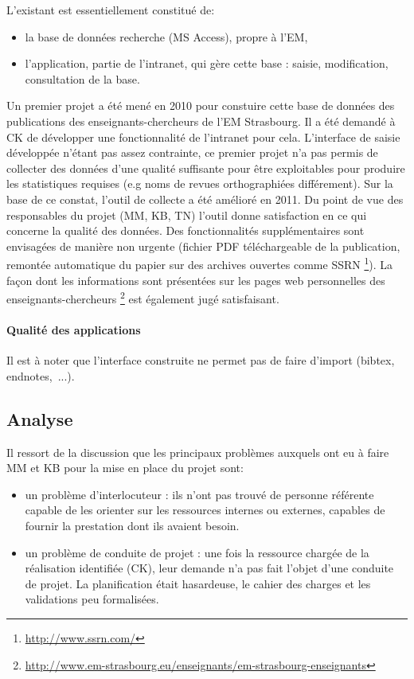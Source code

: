 \documentclass{book}
\begin{document}
L'existant est essentiellement constitué de:
\begin{itemize}
\item la base de données recherche (MS Access), propre à l'EM,
\item l'application, partie de l'intranet, qui gère cette base : saisie, 
modification, consultation de la base.
\end{itemize}
Un premier projet a été mené en 2010 pour constuire cette base de données des
publications des enseignants-chercheurs de l'EM Strasbourg. Il a été demandé à 
CK de développer une fonctionnalité de l'intranet pour cela. L'interface de 
saisie développée n'étant pas assez contrainte, ce premier projet n'a pas 
permis de collecter des données d'une qualité suffisante pour être exploitables
pour produire les statistiques requises (e.g noms de revues orthographiées 
différement). Sur la base de ce constat, l'outil de collecte a été amélioré en 
2011. Du point de vue des responsables du projet (MM, KB, TN) l'outil donne 
satisfaction en ce qui concerne la qualité des données. Des fonctionnalités 
supplémentaires sont envisagées de manière non urgente (fichier PDF téléchargeable 
de la publication, remontée automatique du papier sur des archives ouvertes comme SSRN%
\footnote{\url{ http://www.ssrn.com/}}).
La façon dont les informations sont présentées sur les pages web personnelles
des enseignants-chercheurs%
\footnote{\url{http://www.em-strasbourg.eu/enseignants/em-strasbourg-enseignants}}
est également jugé satisfaisant.

\paragraph{Qualité des applications}
Il est à noter que l'interface construite ne permet pas de faire d'import (bibtex, 
endnotes,~...). 


\subsection{Analyse}

Il ressort de la discussion que les principaux problèmes auxquels ont eu à 
faire MM et KB pour la mise en place du projet sont:
\begin{itemize}
\item un problème d'interlocuteur : ils n'ont pas trouvé de personne référente 
capable de les orienter sur les ressources internes ou externes, capables de fournir 
la prestation dont ils avaient besoin.
\item un problème de conduite de projet : une fois la ressource chargée de la 
réalisation identifiée (CK), leur demande n'a pas fait l'objet d'une conduite
de projet. La planification était hasardeuse, le cahier des charges et
les validations peu formalisées.
\end{itemize}
\end{document}
